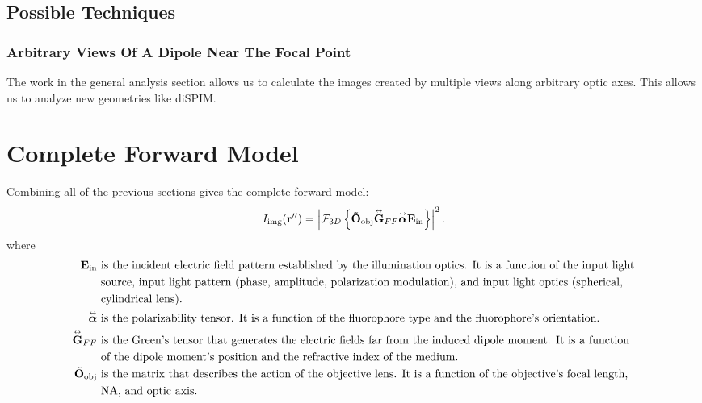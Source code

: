 \documentclass[11pt]{article}
\providecommand{\mb}[1]{\mathbf{#1}}
\providecommand{\bs}[1]{\boldsymbol{#1}}
\newcommand{\tensor}[1]{\overset{\text{\tiny$\leftrightarrow$}}{\mb{#1}}}
\begin{document}
\subsection{Possible Techniques}
\subsubsection{Arbitrary Views Of A Dipole Near The Focal Point}
The work in the general analysis section allows us to calculate the images created by
multiple views along arbitrary optic axes. This allows us to analyze new geometries
like diSPIM. 

\section{Complete Forward Model}
Combining all of the previous sections gives the complete forward
model:
\begin{align}
  I_{\text{img}}(\mb{r''}) = \left|\mathcal{F}_{3D}\left\{
    \mb{\tilde{O}}_{\text{obj}}\tensor{\mathbf{G}}_{FF}\tensor{\bs{\alpha}}\mb{E}_{\text{in}}
  \right\}
  \right|^2.\label{eq:5}
\end{align}
where
\begin{align*}
  \mb{E}_{\text{in}}\ & \text{is the incident electric field pattern established by the illumination optics. It is a function of the input light}\\ & \text{source, input light pattern (phase, amplitude, polarization modulation), and input light optics (spherical,}\\ & \text{cylindrical lens). }\\
  \tensor{\bs{\alpha}}\ & \text{is the polarizability tensor. It is a function of
                          the fluorophore type and the fluorophore's orientation.}\\
  \tensor{\mb{G}}_{FF}\ & \text{is the Green's tensor that generates the electric fields
                          far from the induced dipole moment. It is a function}\\ & \text{of the
                          dipole moment's position and the refractive index of the
                          medium.}\\
  \mb{\tilde{O}}_{\text{obj}}\ & \text{is the matrix that describes the action of the
                                 objective lens. It is a function of the objective's
                                 focal length,}\\ &\text{NA, and optic axis.}
\end{align*}


{}

\end{document}
